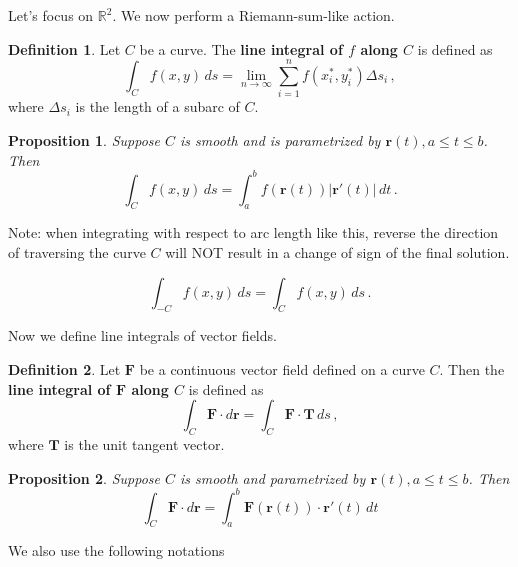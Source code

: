 \documentclass[
]{article}
\newtheorem{proposition}{Proposition}[section]
\theoremstyle{definition}
\newtheorem{definition}{Definition}[section]
\theoremstyle{definition}
\theoremstyle{definition}
\theoremstyle{definition}
\theoremstyle{remark}
\begin{document}
Let's focus on \(\mathbb{R}^2\).
We now perform a Riemann-sum-like action.

\begin{definition}
Let \(C\) be a curve.
The \textbf{line integral of $f$ along $C$} is defined as
\begin{equation*}
    \int_C f(x,y) \, ds = \lim_{n\to \infty} \sum_{i=1}^n f(x_i^*, y_i^*) \Delta s_i \,,
\end{equation*}
where \(\Delta s_i\) is the length of a subarc of \(C\).
\end{definition}

\begin{proposition}
Suppose \(C\) is smooth and is parametrized by \(\mathbf{r}(t), a\leq t \leq b\). Then
\begin{equation*}
    \int_C f(x,y) \, ds = \int_a^b f(\mathbf{r}(t)) |\mathbf{r}'(t)| \, dt \,.
\end{equation*}
\end{proposition}

Note: when integrating with respect to arc length like this, reverse the direction of traversing the curve \(C\) will NOT result
in a change of sign of the final solution.

\begin{equation*}
    \int_{-C} f(x,y) \, ds =  \int_C f(x,y) \, ds \,.
\end{equation*}

Now we define line integrals of vector fields.

\begin{definition}
Let \(\mathbf{F}\) be a continuous vector field defined
on a curve \(C\).
Then the \textbf{line integral of \(\mathbf{F}\) along \(C\)} is defined as
\begin{equation*}
    \int_C \mathbf{F} \cdot d \mathbf{r} 
    = \int_C \mathbf{F}\cdot \mathbf{T} \, ds \,,
\end{equation*}
where \(\mathbf{T}\) is the unit tangent vector.
\end{definition}

\begin{proposition}
Suppose \(C\) is smooth and
parametrized by \(\mathbf{r}(t), a \leq t \leq b\).
Then
\begin{equation*}
    \int_C \mathbf{F} \cdot d \mathbf{r} 
    = \int_a^b \mathbf{F}(\mathbf{r}(t)) \cdot \mathbf{r}'(t) \, dt
\end{equation*}
\end{proposition}

We also use the following notations
\end{document}
